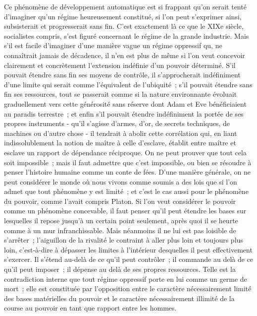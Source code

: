 \documentclass[french,twoside]{book} %
\begin{document}
Ce phénomène de développement automatique est si frappant qu'on serait tenté d'imaginer qu'un régime heureusement constitué, si l'on peut s'exprimer ainsi, subsisterait et progresserait sans fin. C'est exactement là ce que le XIXe siècle, socialistes compris, s'est figuré concernant le régime de la grande industrie. Mais s'il est facile d'imaginer d'une manière vague un régime oppressif qu, ne connaîtrait jamais de décadence, il n'en est plus de même si l'on veut concevoir clairement et concrètement l'extension indéfinie d'un pouvoir déterminé. S'il pouvait étendre sans fin ses moyens de contrôle, il s'approcherait indéfiniment d'une limite qui serait comme l'équivalent de l'ubiquité ; s'il pouvait étendre sans fin ses ressources, tout se passerait comme si la nature environnante évoluait graduellement vers cette générosité sans réserve dont Adam et Eve bénéficiaient au paradis terrestre ; et enfin s'il pouvait étendre indéfiniment la portée de ses propres instruments - qu'il s'agisse d'armes, d'or, de secrets techniques, de machines ou d'autre chose - il tendrait à abolir cette corrélation qui, en liant indissolublement la notion de maître à celle d'esclave, établit entre maître et esclave un rapport de dépendance réciproque. On ne peut prouver que tout cela soit impossible ; mais il faut admettre que c'est impossible, ou bien se résoudre à penser l'histoire humaine comme un conte de fées. D'une manière générale, on ne peut considérer le monde où nous vivons comme soumis a des lois que si l'on admet que tout phénomène y est limité ; et c'est le cas aussi pour le phénomène du pouvoir, comme l'avait compris Platon. Si l'on veut considérer le pouvoir comme un phénomène concevable, il faut penser qu'il peut étendre les bases sur lesquelles il repose jusqu'à un certain point seulement, après quoi il se heurte comme à un mur infranchissable. Mais néanmoins il ne lui est pas loisible de s'arrêter ; l'aiguillon de la rivalité le contraint à aller plus loin et toujours plus loin, c'est-à-dire à dépasser les limites à l'intérieur desquelles il peut effectivement s'exercer. Il s'étend au-delà de ce qu'il peut contrôler ; il commande au delà de ce qu'il peut imposer ; il dépense au delà de ses propres ressources. Telle est la contradiction interne que tout régime oppressif porte en lui comme un germe de mort ; elle est constituée par l'opposition entre le caractère nécessairement limité des bases matérielles du pouvoir et le caractère nécessairement illimité de la course au pouvoir en tant que rapport entre les hommes.\par
\end{document}
